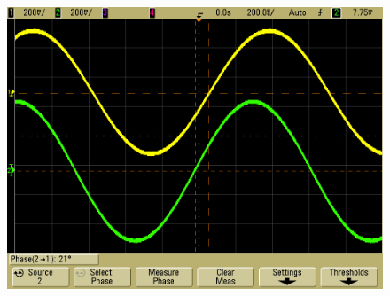 \begin{frame}
\begin{columns}[c]
\begin{figure}[H]
\begin{center}
                \includegraphics[scale=0.1]{./img/oszi/scope_21.png}
        \end{center}
        \end{figure}
        
        
\end{columns}

\end{frame}
